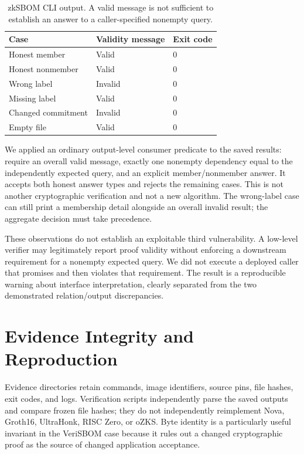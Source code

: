 \documentclass[sigconf,nonacm]{acmart}
\begin{document}
\begin{table}[t]
\caption{zkSBOM CLI output. A valid message is not sufficient to establish an answer to a caller-specified nonempty query.}
\label{tab:zksbom}
\centering\small
\begin{tabular}{@{}lll@{}}
\toprule Case & Validity message & Exit code \\
\midrule
Honest member & Valid & 0 \\
Honest nonmember & Valid & 0 \\
Wrong label & Invalid & 0 \\
Missing label & Valid & 0 \\
Changed commitment & Invalid & 0 \\
Empty file & Valid & 0 \\
\bottomrule
\end{tabular}
\end{table}

We applied an ordinary output-level consumer predicate to the saved results: require an overall valid message, exactly one nonempty dependency equal to the independently expected query, and an explicit member/nonmember answer. It accepts both honest answer types and rejects the remaining cases. This is not another cryptographic verification and not a new algorithm. The wrong-label case can still print a membership detail alongside an overall invalid result; the aggregate decision must take precedence.

These observations do not establish an exploitable third vulnerability. A low-level verifier may legitimately report proof validity without enforcing a downstream requirement for a nonempty expected query. We did not execute a deployed caller that promises and then violates that requirement. The result is a reproducible warning about interface interpretation, clearly separated from the two demonstrated relation/output discrepancies.

\section{Evidence Integrity and Reproduction}
Evidence directories retain commands, image identifiers, source pins, file hashes, exit codes, and logs. Verification scripts independently parse the saved outputs and compare frozen file hashes; they do not independently reimplement Nova, Groth16, UltraHonk, RISC Zero, or oZKS. Byte identity is a particularly useful invariant in the VeriSBOM case because it rules out a changed cryptographic proof as the source of changed application acceptance.
\end{document}
